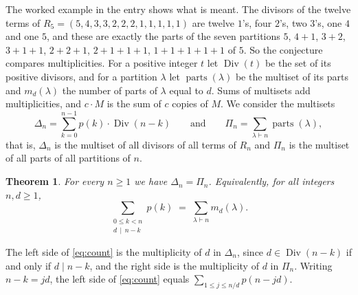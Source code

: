 \documentclass[11pt]{amsart}
\theoremstyle{plain}
\newtheorem{theorem}{Theorem}
\theoremstyle{definition}
\newcommand{\Div}{\operatorname{Div}}
\newcommand{\parts}{\operatorname{parts}}
\begin{document}
The worked example in the entry shows what is meant. The divisors of the twelve terms of $R_5=(5,4,3,3,2,2,2,1,1,1,1,1)$ are twelve $1$'s, four $2$'s, two $3$'s, one $4$ and one $5$, and these are exactly the parts of the seven partitions $5$, $4+1$, $3+2$, $3+1+1$, $2+2+1$, $2+1+1+1$, $1+1+1+1+1$ of $5$.
So the conjecture compares multiplicities.
For a positive integer $t$ let $\Div(t)$ be the set of its positive divisors, and for a partition $\lambda$ let $\parts(\lambda)$ be the multiset of its parts and $m_d(\lambda)$ the number of parts of $\lambda$ equal to $d$.
Sums of multisets add multiplicities, and $c\cdot M$ is the sum of $c$ copies of $M$.
We consider the multisets
\[
  \Delta_n=\sum_{k=0}^{n-1}p(k)\cdot\Div(n-k)\qquad\text{and}\qquad \Pi_n=\sum_{\lambda\vdash n}\parts(\lambda),
\]
that is, $\Delta_n$ is the multiset of all divisors of all terms of $R_n$ and $\Pi_n$ is the multiset of all parts of all partitions of $n$.

\begin{theorem}\label{thm:main}
For every $n\ge1$ we have $\Delta_n=\Pi_n$. Equivalently, for all integers $n,d\ge1$,
\begin{equation}\label{eq:count}
  \sum_{\substack{0\le k<n\\ d\,\mid\, n-k}}p(k)\;=\;\sum_{\lambda\vdash n}m_d(\lambda).
\end{equation}
\end{theorem}

The left side of \eqref{eq:count} is the multiplicity of $d$ in $\Delta_n$, since $d\in\Div(n-k)$ if and only if $d\mid n-k$, and the right side is the multiplicity of $d$ in $\Pi_n$.
Writing $n-k=jd$, the left side of \eqref{eq:count} equals $\sum_{1\le j\le n/d}p(n-jd)$.
\end{document}

